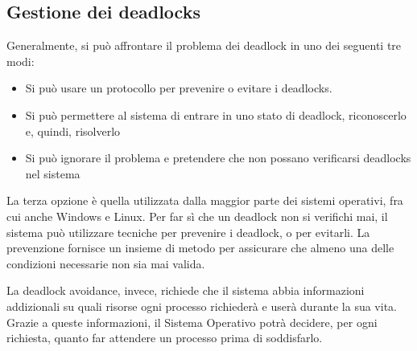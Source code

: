 \documentclass[a4paper]{article}
\begin{document}
\subsection{Gestione dei deadlocks}
Generalmente, si può affrontare il problema dei deadlock in uno dei seguenti tre modi:
\begin{itemize}
   \item Si può usare un protocollo per prevenire o evitare i deadlocks.
   \item Si può permettere al sistema di entrare in uno stato di deadlock, riconoscerlo e, quindi, risolverlo
   \item Si può ignorare il problema e pretendere che non possano verificarsi deadlocks nel sistema
\end{itemize}
La terza opzione è quella utilizzata dalla maggior parte dei sistemi operativi, fra cui anche Windows e Linux.\newline
Per far sì che un deadlock non si verifichi mai, il sistema può utilizzare tecniche per prevenire i deadlock, o per evitarli. La prevenzione fornisce un insieme di metodo per assicurare che almeno una delle condizioni necessarie non sia mai valida.

La deadlock avoidance, invece, richiede che il sistema abbia informazioni addizionali su quali risorse ogni processo richiederà e userà durante la sua vita. Grazie a queste informazioni, il Sistema Operativo potrà decidere, per ogni richiesta, quanto far attendere un processo prima di soddisfarlo.
\end{document}
